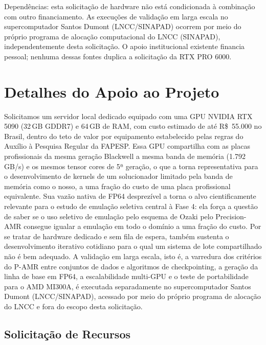 \documentclass[12pt,a4paper]{article}
\newcommand{\pamr}{P\nobreakdash-AMR}
\begin{document}
Dependências: esta solicitação de hardware não está condicionada à combinação
com outro financiamento. As execuções de validação em larga escala no
supercomputador Santos Dumont (LNCC/SINAPAD) ocorrem por meio do próprio
programa de alocação computacional do LNCC (SINAPAD), independentemente desta
solicitação. O apoio institucional existente financia pessoal; nenhuma dessas
fontes duplica a solicitação da RTX PRO 6000.

\fi

\section{Detalhes do Apoio ao Projeto}

Solicitamos um servidor local dedicado equipado com uma GPU NVIDIA RTX 5090
(32\,GB GDDR7) e 64\,GB de RAM, com custo estimado de até R\$~55.000 no
Brasil, dentro do teto de valor por equipamento estabelecido pelas regras
do Auxílio à Pesquisa Regular da FAPESP. Essa GPU compartilha com as placas
profissionais da mesma geração Blackwell a mesma banda de memória
(1.792\,GB/s) e os mesmos tensor cores de 5ª geração, o que a torna
representativa para o desenvolvimento de kernels de um solucionador
limitado pela banda de memória como o nosso, a uma fração do custo de uma
placa profissional equivalente. Sua vazão nativa de FP64 desprezível a
torna o alvo cientificamente relevante para o estudo de emulação seletiva
central à Fase 4: ela força a questão de saber se o uso seletivo de
emulação pelo esquema de Ozaki pelo Precision-AMR consegue igualar a
emulação em todo o domínio a uma fração do custo. Por se tratar de
hardware dedicado e sem fila de espera, também sustenta o desenvolvimento
iterativo cotidiano para o qual um sistema de lote compartilhado não é bem
adequado. A validação em larga escala, isto é, a varredura dos critérios do
\pamr{} entre conjuntos de dados e algoritmos de checkpointing, a geração da
linha de base em FP64, a escalabilidade multi-GPU e o teste de portabilidade
para o AMD MI300A, é executada separadamente no supercomputador Santos Dumont
(LNCC/SINAPAD), acessado por meio do próprio programa de alocação do LNCC e
fora do escopo desta solicitação.

\subsection*{Solicitação de Recursos}
\end{document}
